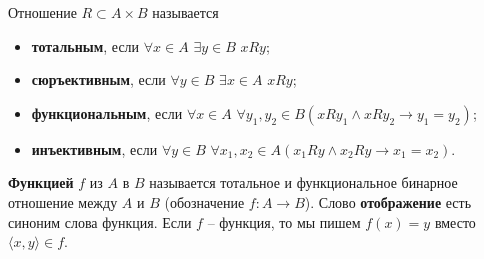 \begin{definition}Отношение $R \subset A \times B$ называется
	\begin{itemize}
		\item \textbf{тотальным}, если $ \forall x \in A$ $\exists y \in B$ $xRy$;

		\item \textbf{сюръективным}, если $ \forall y \in B$ $\exists x \in A$ $xRy$;

		\item \textbf{функциональным}, если $ \forall x \in A$ $\forall y_1, y_2 \in B (xRy_1 \land xRy_2 \rightarrow
			y_1 = y_2)$;

		\item \textbf{инъективным}, если $ \forall y \in B$ $\forall x_1, x_2 \in A (x_1 Ry \land x_2 Ry \rightarrow
			x_1 = x_2)$.
	\end{itemize}
	\textbf{Функцией} $f$ из $A$ в $B$ называется тотальное и функциональное бинарное отношение между $A$ и $B$
	(обозначение $f\colon A \to B$). Слово \textbf{отображение} есть синоним слова функция. Если $f$ -- функция, то
	мы пишем $f(x) = y$ вместо $\langle x, y \rangle \in f$.
\end{definition}
